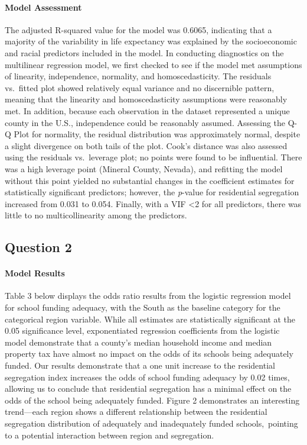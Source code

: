 \documentclass[
  10pt,
  letterpaper,
  DIV=11,
  numbers=noendperiod]{scrartcl}
\let\oldparagraph\paragraph
\renewcommand{\paragraph}[1]{\oldparagraph{#1}\mbox{}}
\begin{document}
\paragraph{Model Assessment}\label{model-assessment}

The adjusted R-squared value for the model was 0.6065, indicating that a
majority of the variability in life expectancy was explained by the
socioeconomic and racial predictors included in the model. In conducting
diagnostics on the multilinear regression model, we first checked to see
if the model met assumptions of linearity, independence, normality, and
homoscedasticity. The residuals vs.~fitted plot showed relatively equal
variance and no discernible pattern, meaning that the linearity and
homoscedasticity assumptions were reasonably met. In addition, because
each observation in the dataset represented a unique county in the U.S.,
independence could be reasonably assumed. Assessing the Q-Q Plot for
normality, the residual distribution was approximately normal, despite a
slight divergence on both tails of the plot. Cook's distance was also
assessed using the residuals vs.~leverage plot; no points were found to
be influential. There was a high leverage point (Mineral County,
Nevada), and refitting the model without this point yielded no
substantial changes in the coefficient estimates for statistically
significant predictors; however, the \emph{p}-value for residential
segregation increased from 0.031 to 0.054. Finally, with a VIF
\textless2 for all predictors, there was little to no multicollinearity
among the predictors.

\subsection{Question 2}\label{question-2}

\paragraph{Model Results}\label{model-results-1}

Table 3 below displays the odds ratio results from the logistic
regression model for school funding adequacy, with the South as the
baseline category for the categorical region variable. While all
estimates are statistically significant at the 0.05 significance level,
exponentiated regression coefficients from the logistic model
demonstrate that a county's median household income and median property
tax have almost no impact on the odds of its schools being adequately
funded. Our results demonstrate that a one unit increase to the
residential segregation index increases the odds of school funding
adequacy by 0.02 times, allowing us to conclude that residential
segregation has a minimal effect on the odds of the school being
adequately funded. Figure 2 demonstrates an interesting trend---each
region shows a different relationship between the residential
segregation distribution of adequately and inadequately funded
schools,~pointing to a potential interaction between region and
segregation. ~
\end{document}
